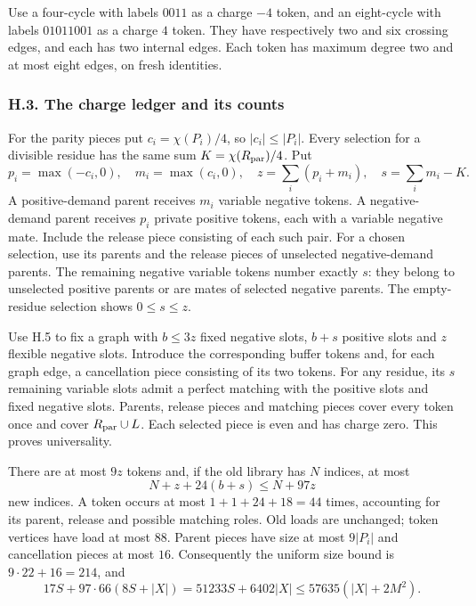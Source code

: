\documentclass[english,11pt,a4paper]{article}
\begin{document}
Use a four-cycle with labels \(0011\) as a charge \(-4\) token, and an eight-cycle with labels \(01011001\) as a charge \(4\) token. They have respectively two and six crossing edges, and each has two internal edges. Each token has maximum degree two and at most eight edges, on fresh identities.

\subsubsection{H.3. The charge ledger and its counts}\label{h.3.-the-charge-ledger-and-its-counts}

For the parity pieces put \(c_i=\chi(P_i)/4\), so \(|c_i|\le|P_i|\). Every selection for a divisible residue has the same sum \(K=\chi(R_{\rm par})/4\). Put \[p_i=\max(-c_i,0),\quad m_i=\max(c_i,0),\quad
z=\sum_i(p_i+m_i),\quad s=\sum_i m_i-K.\] A positive-demand parent receives \(m_i\) variable negative tokens. A negative-demand parent receives \(p_i\) private positive tokens, each with a variable negative mate. Include the release piece consisting of each such pair. For a chosen selection, use its parents and the release pieces of unselected negative-demand parents. The remaining negative variable tokens number exactly \(s\): they belong to unselected positive parents or are mates of selected negative parents. The empty-residue selection shows \(0\le s\le z\).

Use H.5 to fix a graph with \(b\le3z\) fixed negative slots, \(b+s\) positive slots and \(z\) flexible negative slots. Introduce the corresponding buffer tokens and, for each graph edge, a cancellation piece consisting of its two tokens. For any residue, its \(s\) remaining variable slots admit a perfect matching with the positive slots and fixed negative slots. Parents, release pieces and matching pieces cover every token once and cover \(R_{\rm par}\cup L\). Each selected piece is even and has charge zero. This proves universality.

There are at most \(9z\) tokens and, if the old library has \(N\) indices, at most \[N+z+24(b+s)\le N+97z\] new indices. A token occurs at most \(1+1+24+18=44\) times, accounting for its parent, release and possible matching roles. Old loads are unchanged; token vertices have load at most \(88\). Parent pieces have size at most \(9|P_i|\) and cancellation pieces at most \(16\). Consequently the uniform size bound is \(9\cdot22+16=214\), and \[17S+97\cdot66(8S+|X|)
=51233S+6402|X|\le57635(|X|+2M^2).\]
\end{document}

